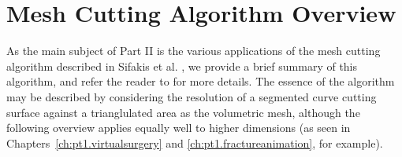 \section*{Mesh Cutting Algorithm Overview}

As the main subject of Part II is the various applications of the mesh cutting algorithm described in Sifakis et al. \cite{Sifakis07}, we provide a brief summary of this algorithm, and refer the reader to \cite{Sifakis07} for more details. The essence of the algorithm may be described by considering the resolution of a segmented curve cutting surface against a trianglulated area as the volumetric mesh, although the following overview applies equally well to higher dimensions (as seen in Chapters~\ref{ch:pt1.virtualsurgery} and \ref{ch:pt1.fractureanimation}, for example).


